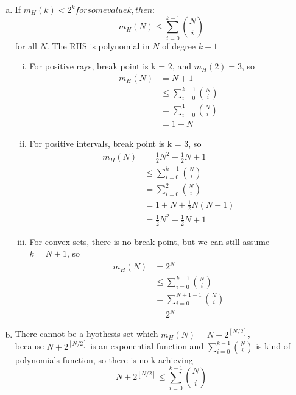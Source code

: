 \documentclass[11pt]{article}
\begin{document}
\begin{enumerate} [(a)]
\item 
{} If $m_H(k)<2^k for some value k, then:$
\[
m_H(N)\leq \sum^{k-1}_{i=0}{N \choose i}
\]for all $N$. The RHS is polynomial in $N$ of degree $k-1$
\begin{enumerate}[(i)]
\item For positive rays, break point is k = 2, and $m_H(2)=3$, so
\[
\begin{aligned}
m_H(N)&=N+1\\
&\leq \sum^{k-1}_{i=0}{N \choose i}\\
&=\sum^{1}_{i=0}{N \choose i}\\
&=1+N
\end{aligned}
\]

\item For positive intervals, break point is k = 3, so
\[
\begin{aligned}
m_H(N)&=\frac{1}{2} N^2+\frac{1}{2} N+1\\
&\leq \sum^{k-1}_{i=0}{N \choose i}\\
&=\sum^{2}_{i=0}{N \choose i}\\
&=1+N+\frac{1}{2}N(N-1)\\
&=\frac{1}{2} N^2+\frac{1}{2} N+1
\end{aligned}
\]

\item For convex sets, there is no break point, but we can still assume $k=N+1$, so
\[
\begin{aligned}
m_H(N)&=2^N\\
&\leq \sum^{k-1}_{i=0}{N \choose i}\\
&= \sum^{N+1-1}_{i=0}{N \choose i}\\
&= 2^N
\end{aligned}
\]
\end{enumerate}

\item There cannot be a hyothesis set which $m_H(N)=N+2^{[N/2]}$,\\
because $N+2^{[N/2]}$ is an exponential function and $\sum^{k-1}_{i=0}{N \choose i}$ is kind of polynomials function, so there is no k achieving
\[
N+2^{[N/2]}\leq\sum^{k-1}_{i=0}{N \choose i}
\]
\end{enumerate}

\newpage
\end{document}
